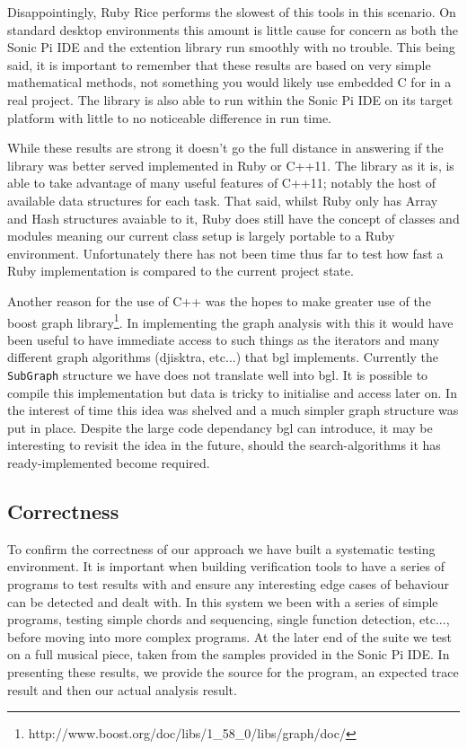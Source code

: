 \documentclass[11pt, abstracton, twoside, titlepage=true]{scrartcl}
\begin{document}
Disappointingly, Ruby Rice performs the slowest of this tools in this scenario. 
On standard desktop environments this amount is little cause for concern as both
the Sonic Pi IDE and the extention library run smoothly with no trouble. This being 
said, it is important to remember that these results are based on very simple 
mathematical methods, not something you would likely use embedded C for in a real 
project. The library is also able to run within the Sonic Pi IDE on its target 
platform with little to no noticeable difference in run time.

While these results are strong it doesn't go the full distance in answering if the
library was better served implemented in Ruby or C++11. The library as it is, is able
to take advantage of many useful features of C++11; notably the host of available
data structures for each task. That said, whilst Ruby only has Array and Hash 
structures avaiable to it, Ruby does still have the concept of classes and modules 
meaning our current class setup is largely portable to a Ruby environment. 
Unfortunately there has not been time thus far to test how fast a Ruby implementation
is compared to the current project state.

Another reason for the use of C++ was the hopes to make greater use of the boost
graph library\footnote{http://www.boost.org/doc/libs/1\_58\_0/libs/graph/doc/}. 
In implementing the graph analysis with this it would have been useful to have
immediate access to such things as the iterators and many different graph algorithms
(djisktra, etc...) that bgl implements. Currently the \texttt{SubGraph} structure
we have does not translate well into bgl. It is possible to compile this 
implementation but data is tricky to initialise and access later on. In the interest
of time this idea was shelved and a much simpler graph structure was put in place.
Despite the large code dependancy bgl can introduce, it may be interesting to
revisit the idea in the future, should the search-algorithms it has ready-implemented
become required.

\subsection{Correctness}
To confirm the correctness of our approach we have built a systematic testing
environment. It is important when building verification tools to have a series
of programs to test results with and ensure any interesting edge cases of behaviour
can be detected and dealt with. In this system we been with a series of simple
programs, testing simple chords and sequencing, single function detection, etc...,
before moving into more complex programs. At the later end of the suite we test
on a full musical piece, taken from the samples provided in the Sonic Pi IDE. In
presenting these results, we provide the source for the program, an expected trace
result and then our actual analysis result.
\end{document}
